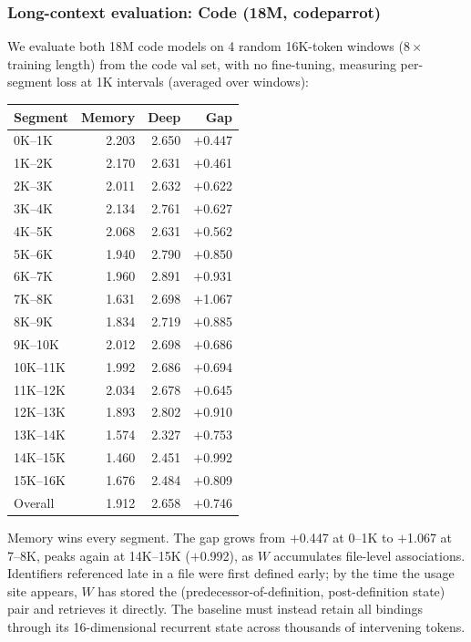 \documentclass{article}
\begin{document}
\FloatBarrier
\subsubsection*{Long-context evaluation: Code (18M, codeparrot)}
We evaluate both 18M code models on 4 random 16K-token windows ($8\times$ training length) from the code val set, with no fine-tuning, measuring per-segment loss at 1K intervals (averaged over windows):

\begin{table}[h]
\centering
\begin{tabular}{lrrr}
\toprule
Segment & Memory & Deep & Gap \\
\midrule
0K--1K   & 2.203 & 2.650 & $+$0.447 \\
1K--2K   & 2.170 & 2.631 & $+$0.461 \\
2K--3K   & 2.011 & 2.632 & $+$0.622 \\
3K--4K   & 2.134 & 2.761 & $+$0.627 \\
4K--5K   & 2.068 & 2.631 & $+$0.562 \\
5K--6K   & 1.940 & 2.790 & $+$0.850 \\
6K--7K   & 1.960 & 2.891 & $+$0.931 \\
7K--8K   & 1.631 & 2.698 & $+$1.067 \\
8K--9K   & 1.834 & 2.719 & $+$0.885 \\
9K--10K  & 2.012 & 2.698 & $+$0.686 \\
10K--11K & 1.992 & 2.686 & $+$0.694 \\
11K--12K & 2.034 & 2.678 & $+$0.645 \\
12K--13K & 1.893 & 2.802 & $+$0.910 \\
13K--14K & 1.574 & 2.327 & $+$0.753 \\
14K--15K & 1.460 & 2.451 & $+$0.992 \\
15K--16K & 1.676 & 2.484 & $+$0.809 \\
\midrule
Overall  & 1.912 & 2.658 & $+$0.746 \\
\bottomrule
\end{tabular}
\end{table}

Memory wins every segment. The gap grows from $+$0.447 at 0--1K to $+$1.067 at 7--8K, peaks again at 14K--15K ($+$0.992), as $W$ accumulates file-level associations. Identifiers referenced late in a file were first defined early; by the time the usage site appears, $W$ has stored the (predecessor-of-definition, post-definition state) pair and retrieves it directly. The baseline must instead retain all bindings through its 16-dimensional recurrent state across thousands of intervening tokens.
\end{document}
